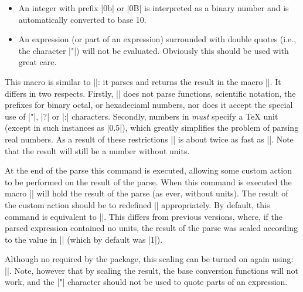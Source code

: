 \begin{command}{\pgfmathparse{}}
\begin{itemize}
	\item
  An integer with prefix |0b| or |0B| is interpreted as a binary
  number and is automatically converted to base 10. 
  
  \item
  An expression (or part of an expression) surrounded with double
  quotes (i.e., the character |"|) will not be evaluated. 
  Obviously this should be used with great care. 

\end{itemize}
  
\end{command}



\begin{command}{\pgfmathqparse{}}
  This macro is similar to |\pgfmathparse|: it parses 
   and returns the result in the macro 
  |\pgfmathresult|. It differs in two respects. Firstly, 
  |\pgfmathqparse| does not parse functions, scientific
  notation, the prefixes for binary octal, or hexadeciaml numbers,
  nor does it accept the special use of |"|, |?| or |:| characters.
  Secondly, numbers in  \emph{must}
  specify a \TeX{} unit (except in such instances as |0.5\pgf@x|), 
  which greatly simplifies the problem of parsing real numbers.
  As a result of these restrictions |\pgfmathqparse| 
  is about twice as fast as |\pgfmathparse|. Note that the result 
  will still be a number without units.	
\end{command}

\begin{command}{\pgfmathpostparse}

  At the end of the parse this command is executed, allowing some 
  custom action to be performed on the result of the parse. When this
  command is executed the macro |\pgfmathresult| will hold the result
  of the parse (as ever, without units). The result of the custom
  action should be to redefined |\pgfmathresult| appropriately.   
  By default, this command is equivalent to |\relax|. This differs
  from previous versions, where, if the parsed expression contained
  no units, the result of the parse was scaled according to the value
  in |\pgfmathresultunitscale| (which by default was |1|).
  
  Although no required by
  the package, this scaling can be  turned on again using:
  |\let\pgfmathpostparse=\pgfmathscaleresult|.
  Note, however that by scaling the result, the base conversion
  functions will not work, and the |"| character should not be
  used to quote parts of an expression. 
    
\end{command}

